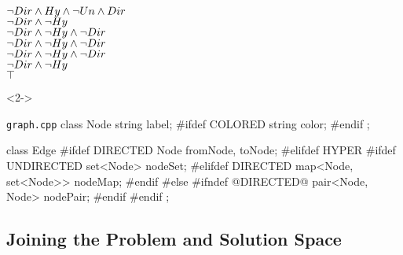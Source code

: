 \begin{frame}[fragile]{\myframetitle}
\begin{mycolumns}[t,columns=3,widths={40,23,37},animation=none]
{{\begin{flushright}
				{\color{gray}$\neg Dir \wedge Hy \wedge \neg Un \wedge Dir$}\\
				{\color{green}$\neg Dir \wedge \neg Hy$}\\
				{\color{red}$\neg Dir \wedge \neg Hy \wedge \neg Dir$}\\
				{\color{red}$\neg Dir \wedge \neg Hy \wedge \neg Dir$}\\
				{\color{red}$\neg Dir \wedge \neg Hy \wedge \neg Dir$}\\
				{\color{green}$\neg Dir \wedge \neg Hy$}\\
				{\color{gray}$\top$}
			\end{flushright}
		}}
	\mynextcolumn
		\begin{uncoverenv}<2->
			\begin{cpptight}[basicstyle=\small]{\texttt{graph.cpp}}
class Node {
	string label;
#ifdef COLORED
	string color;
#endif
};

class Edge {
#ifdef DIRECTED
	Node fromNode, toNode;
#elifdef HYPER
#ifdef UNDIRECTED
	set<Node> nodeSet;
#elifdef DIRECTED
	map<Node, set<Node>> nodeMap;
#endif
#else
#ifndef @DIRECTED@
	pair<Node, Node> nodePair;
#endif
#endif
};
			\end{cpptight}
		\end{uncoverenv}
	\end{mycolumns}
\end{frame}

\subsection{Joining the Problem and Solution Space}

